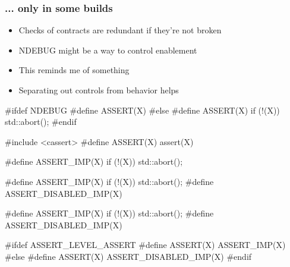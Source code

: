 \begin{frame}[fragile]
  \frametitle{... only in some builds}

  \begin{itemize}
  \item<1-> Checks of contracts are redundant if they're not broken
  \item<2-> NDEBUG might be a way to control enablement
  \item<3-> This reminds me of something
  \item<4-> Separating out controls from behavior helps
  \end{itemize}

\begin{overprint}
\begin{cppcodebox}
#ifdef NDEBUG
#define ASSERT(X)
#else
#define ASSERT(X) if (!(X)) { std::abort(); }
#endif
\end{cppcodebox}

\begin{cppcodebox}
#include <cassert>
#define ASSERT(X) assert(X)
\end{cppcodebox}

\begin{cppcodebox}
#define ASSERT_IMP(X)          if (!(X)) { std::abort(); }
\end{cppcodebox}

\begin{cppcodebox}
#define ASSERT_IMP(X)          if (!(X)) { std::abort(); }
#define ASSERT_DISABLED_IMP(X)
\end{cppcodebox}

\begin{cppcodebox}
#define ASSERT_IMP(X)          if (!(X)) { std::abort(); }
#define ASSERT_DISABLED_IMP(X)

#ifdef ASSERT_LEVEL_ASSERT
#define ASSERT(X) ASSERT_IMP(X)
#else
#define ASSERT(X) ASSERT_DISABLED_IMP(X)
#endif
\end{cppcodebox}

\end{overprint}
  
\end{frame}

